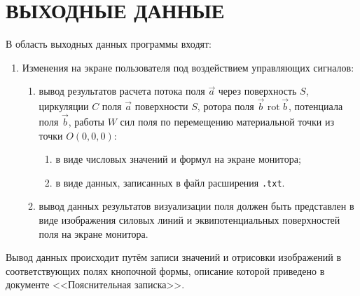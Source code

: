 \documentclass[14pt,a4paper,final]{extreport}
\begin{document}
\chapter{ВЫХОДНЫЕ ДАННЫЕ}
В область выходных данных программы входят:
\begin{enumerate}
	\item Изменения на экране пользователя под воздействием управляющих
	сигналов: 
	\begin{enumerate}[label=\asbuk*),ref=\asbuk*]
		\item вывод результатов расчета потока поля \( \vec a \) через поверхность \( S \), циркуляции \( C \) поля \( \vec a \) поверхности \( S \), ротора поля \( \vec b \) \( \mathrm{rot}\,\vec b \), потенциала поля \( \vec b \), работы \( W \) сил поля по перемещению материальной точки из точки \(O(0,0,0) \):
		\begin{enumerate}
			\item в виде числовых значений и формул на экране монитора;
			\item в виде данных, записанных в файл расширения \texttt{.txt}.
		\end{enumerate}
		\item вывод данных результатов визуализации поля должен быть представлен в виде изображения силовых линий и эквипотенциальных поверхностей поля на экране монитора.
	\end{enumerate}
\end{enumerate}
Вывод данных происходит путём записи значений и отрисовки изображений
в соответствующих полях кнопочной формы,
описание которой приведено в документе <<Пояснительная записка>>.

\pagebreak

\label{lastpage}

\end{document}
